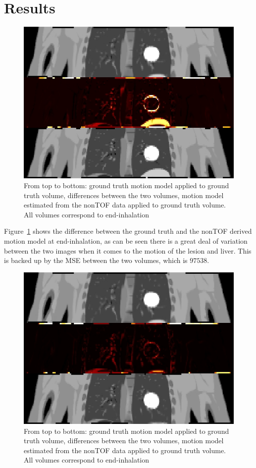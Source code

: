 \documentclass[journal]{IEEEtran}
\begin{document}
\section{Results}
\begin{figure}
    \centering
    \includegraphics[scale=0.4]{figures/non_tof.png}
    \caption{From top to bottom: ground truth motion model applied to ground truth volume, differences between the two volumes, motion model estimated from the nonTOF data applied to ground truth volume. All volumes correspond to end-inhalation}
    \label{fig:non_tof}
\end{figure}

Figure~\ref{fig:non_tof} shows the difference between the ground truth and the nonTOF derived motion model at end-inhalation, as can be seen there is a great deal of variation between the two images when it comes to the motion of the lesion and liver. This is backed up by the MSE between the two volumes, which is $97538$.

\begin{figure}
    \centering
    \includegraphics[scale=0.4]{figures/tof.png}
    \caption{From top to bottom: ground truth motion model applied to ground truth volume, differences between the two volumes, motion model estimated from the nonTOF data applied to ground truth volume. All volumes correspond to end-inhalation}
    \label{fig:tof}
\end{figure}
\end{document}
